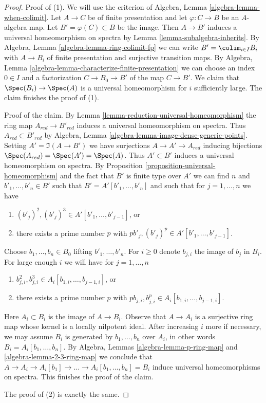 \begin{proof}
Proof of (1). We will use the criterion of
Algebra, Lemma \ref{algebra-lemma-when-colimit}.
Let $A \to C$ be of finite presentation and let $\varphi : C \to B$
be an $A$-algebra map. Let $B' = \varphi(C) \subset B$ be the image.
Then $A \to B'$ induces a universal homeomorphism on spectra by
Lemma \ref{lemma-subalgebra-inherits}.
By Algebra, Lemma \ref{algebra-lemma-ring-colimit-fp}
we can write $B' = \colim_{i \in I} B_i$
with $A \to B_i$ of finite presentation and surjective
transition maps.
By Algebra, Lemma \ref{algebra-lemma-characterize-finite-presentation}
we can choose an index $0 \in I$
and a factorization $C \to B_0 \to B'$ of the map $C \to B'$.
We claim that $\Spec(B_i) \to \Spec(A)$ is a universal homeomorphism
for $i$ sufficiently large. The claim finishes the proof of (1).

\medskip\noindent
Proof of the claim. By Lemma \ref{lemma-reduction-universal-homeomorphism}
the ring map $A_{red} \to B'_{red}$ induces a universal homeomorphism
on spectra. Thus $A_{red} \subset B'_{red}$ by
Algebra, Lemma \ref{algebra-lemma-image-dense-generic-points}.
Setting $A' = \Im(A \to B')$ we have surjections $A \to A' \to A_{red}$
inducing bijections $\Spec(A_{red}) = \Spec(A') = \Spec(A)$.
Thus $A' \subset B'$ induces a universal homeomorphism on spectra.
By Proposition \ref{proposition-universal-homeomorphism}
and the fact that $B'$ is finite type over $A'$ we can
find $n$ and $b'_1, \ldots, b'_n \in B'$ such that
$B' = A'[b'_1, \ldots, b'_n]$
and such that for $j = 1, \ldots, n$ we have
\begin{enumerate}
\item $(b'_j)^2, (b'_j)^3 \in A'[b'_1, \ldots, b'_{j - 1}]$, or
\item there exists a prime number $p$ with
$pb'_j, (b'_j)^p \in A'[b'_1, \ldots, b'_{j - 1}]$.
\end{enumerate}
Choose $b_1, \ldots, b_n \in B_0$ lifting $b'_1, \ldots, b'_n$.
For $i \geq 0$ denote $b_{j, i}$ the image of $b_j$ in $B_i$.
For large enough $i$ we will have for $j = 1, \ldots, n$
\begin{enumerate}
\item $b_{j, i}^2, b_{j, i}^3 \in A_i[b_{1, i}, \ldots, b_{j - 1, i}]$, or
\item there exists a prime number $p$ with
$pb_{j, i}, b_{j, i}^p \in A_i[b_{1, i}, \ldots, b_{j - 1, i}]$.
\end{enumerate}
Here $A_i \subset B_i$ is the image of $A \to B_i$. Observe that $A \to A_i$
is a surjective ring map whose kernel is a locally nilpotent ideal.
After increasing $i$ more if necessary, we may assume $B_i$
is generated by $b_1, \ldots, b_n$ over $A_i$, in other words
$B_i = A_i[b_1, \ldots, b_n]$.
By Algebra, Lemmas \ref{algebra-lemma-p-ring-map} and
\ref{algebra-lemma-2-3-ring-map} we conclude that
$A \to A_i \to A_i[b_1] \to \ldots \to A_i[b_1, \ldots, b_n] = B_i$
induce universal homeomorphisms on spectra. This finishes the proof
of the claim.

\medskip\noindent
The proof of (2) is exactly the same.
\end{proof}







